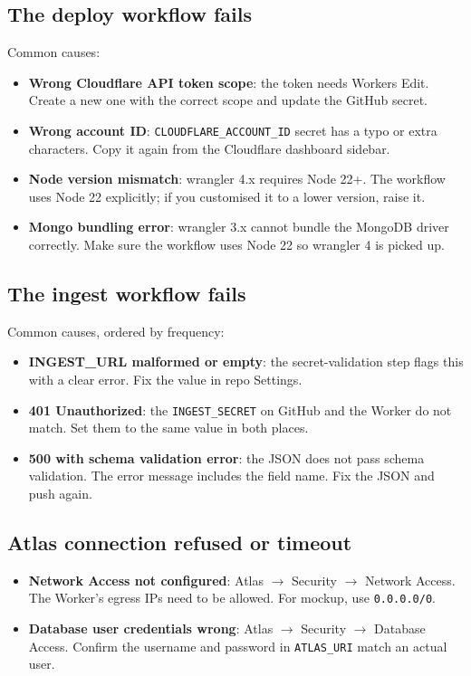 \documentclass[11pt,a4paper]{article}
\begin{document}
\subsection{The deploy workflow fails}

Common causes:

\begin{itemize}[leftmargin=1.5em,itemsep=2pt]
  \item \textbf{Wrong Cloudflare API token scope}: the token needs Workers Edit. Create a new one with the correct scope and update the GitHub secret.
  \item \textbf{Wrong account ID}: \texttt{CLOUDFLARE\_ACCOUNT\_ID} secret has a typo or extra characters. Copy it again from the Cloudflare dashboard sidebar.
  \item \textbf{Node version mismatch}: wrangler 4.x requires Node 22+. The workflow uses Node 22 explicitly; if you customised it to a lower version, raise it.
  \item \textbf{Mongo bundling error}: wrangler 3.x cannot bundle the MongoDB driver correctly. Make sure the workflow uses Node 22 so wrangler 4 is picked up.
\end{itemize}

\subsection{The ingest workflow fails}

Common causes, ordered by frequency:

\begin{itemize}[leftmargin=1.5em,itemsep=2pt]
  \item \textbf{INGEST\_URL malformed or empty}: the secret-validation step flags this with a clear error. Fix the value in repo Settings.
  \item \textbf{401 Unauthorized}: the \texttt{INGEST\_SECRET} on GitHub and the Worker do not match. Set them to the same value in both places.
  \item \textbf{500 with schema validation error}: the JSON does not pass schema validation. The error message includes the field name. Fix the JSON and push again.
\end{itemize}

\subsection{Atlas connection refused or timeout}

\begin{itemize}[leftmargin=1.5em,itemsep=2pt]
  \item \textbf{Network Access not configured}: Atlas \(\rightarrow\) Security \(\rightarrow\) Network Access. The Worker's egress IPs need to be allowed. For mockup, use \texttt{0.0.0.0/0}.
  \item \textbf{Database user credentials wrong}: Atlas \(\rightarrow\) Security \(\rightarrow\) Database Access. Confirm the username and password in \texttt{ATLAS\_URI} match an actual user.
\end{itemize}
\end{document}
